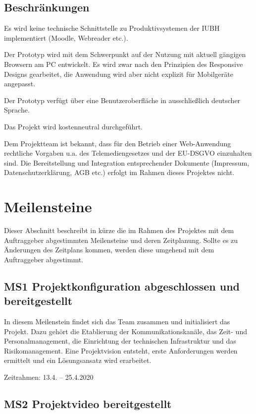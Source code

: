 \documentclass[a4paper,11pt,listof=numbered,glossary=totoc,parskip=half,toc=bib]{scrreprt}
\begin{document}
\subsection{Beschränkungen}
Es wird keine technische Schnittstelle zu Produktivsystemen der IUBH implementiert (Moodle, Webreader etc.).

Der Prototyp wird mit dem Schwerpunkt auf der Nutzung mit aktuell gängigen Browsern am PC entwickelt. Es wird zwar nach den Prinzipien des Responsive Designs gearbeitet, die Anwendung wird aber nicht explizit für Mobilgeräte angepasst.

Der Prototyp verfügt über eine Benutzeroberfläche in ausschließlich deutscher Sprache.

Das Projekt wird kostenneutral durchgeführt.

Dem Projektteam ist bekannt, dass für den Betrieb einer Web-Anwendung rechtliche Vorgaben u.a. des Telemediengesetzes und der EU-DSGVO einzuhalten sind. Die Bereitstellung und Integration entsprechender Dokumente (Impressum, Datenschutzerklärung, AGB etc.) erfolgt im Rahmen dieses Projektes nicht.	
	
	\newpage
	\section{Meilensteine}
Dieser Abschnitt beschreibt in kürze die im Rahmen des Projektes mit dem Auftraggeber abgestimmten Meilensteine und deren Zeitplanung.
Sollte es zu Änderungen des Zeitplans kommen, werden diese umgehend mit dem Auftraggeber abgestimmt.

\subsection{MS1 Projektkonfiguration abgeschlossen und bereitgestellt}

In diesem Meilenstein findet sich das Team zusammen und initialisiert das Projekt. 
Dazu gehört die Etablierung der Kommunikationskanäle, das Zeit- und Personalmanagement, die Einrichtung der technischen Infrastruktur und das Risikomanagement.
Eine Projektvision entsteht, erste Anforderungen werden ermittelt und ein Lösungsansatz wird erarbeitet.

Zeitrahmen: 13.4. -- 25.4.2020


\subsection{MS2 Projektvideo bereitgestellt}
\end{document}
